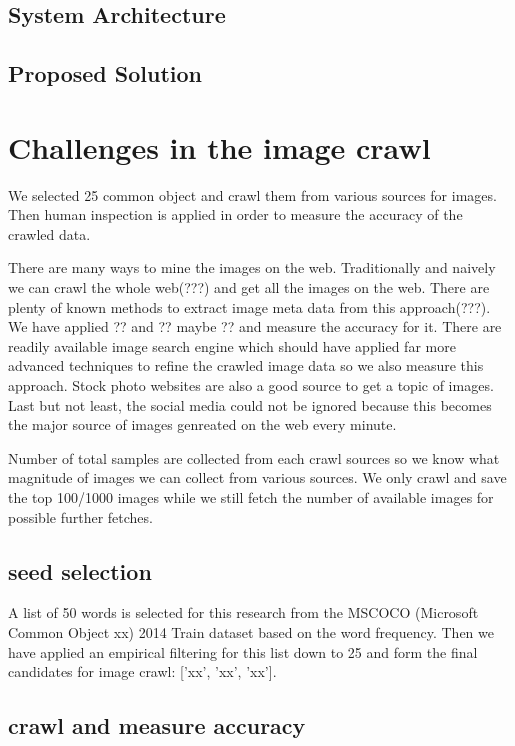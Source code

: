 \documentclass[paper=a4, fontsize=11pt]{scrartcl}
\numberwithin{equation}{section}		%
\numberwithin{figure}{section}			%
\numberwithin{table}{section}				%
\begin{document}
\begin{multicols}{2}
\subsection{System Architecture}

\subsection{Proposed Solution}


\section{Challenges in the image crawl}

We selected 25 common object and crawl them from various sources for images. Then human inspection is applied in order to measure the accuracy of the crawled data.

\noindent There are many ways to mine the images on the web. Traditionally and naively we can crawl the whole web(???) and get all the images on the web. There are plenty of known methods to extract image meta data from this approach(???). We have applied ?? and ?? maybe ?? and measure the accuracy for it. There are readily available image search engine which should have applied far more advanced techniques to refine the crawled image data so we also measure this approach. Stock photo websites are also a good source to get a topic of images. Last but not least, the social media could not be ignored because this becomes the major source of images genreated on the web every minute.

\noindent Number of total samples are collected from each crawl sources so we know what magnitude of images we can collect from various sources. We only crawl and save the top 100/1000 images while we still fetch the number of available images for possible further fetches.

\subsection{seed selection}

A list of 50 words is selected for this research from the MSCOCO (Microsoft Common Object xx) 2014 Train dataset based on the word frequency. Then we have applied an empirical filtering for this list down to 25 and form the final candidates for image crawl: ['xx', 'xx', 'xx'].

\subsection{crawl and measure accuracy}


\end{multicols}
\end{document}
